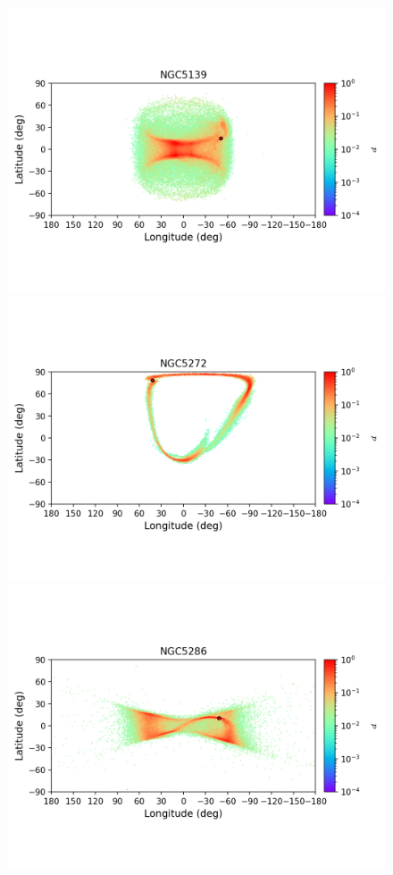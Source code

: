         \begin{figure}
        \includegraphics[clip=true, trim = 0mm 20mm 0mm 10mm, width=1\columnwidth]{images/error_plots_NGC5139.png}
        \includegraphics[clip=true, trim = 0mm 20mm 0mm 10mm, width=1\columnwidth]{images/error_plots_NGC5272.png}
        \includegraphics[clip=true, trim = 0mm 20mm 0mm 10mm, width=1\columnwidth]{images/error_plots_NGC5286.png}

\end{figure}
